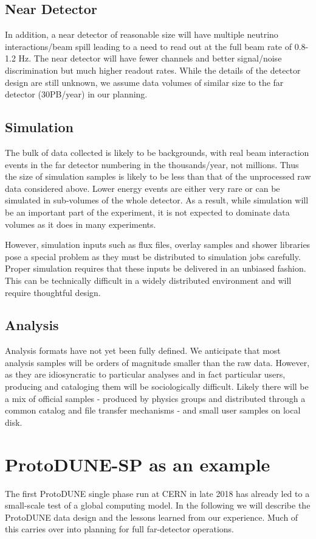 \subsection{Near Detector}
In addition, a near detector of reasonable size will have multiple neutrino interactions/beam spill leading to a need to read out at the full beam rate of 0.8-1.2 Hz.
The near detector will have fewer channels and better signal/noise discrimination but much higher readout rates.  While the details of the detector design are still unknown, we assume data volumes of similar size to the far detector (30PB/year) in our planning.

\subsection{Simulation}
The bulk of data collected is likely to be backgrounds, with real beam interaction events in the far detector numbering in the thousands/year, not millions. Thus the size of simulation samples is likely to be less than that of the unprocessed raw data considered above.  Lower energy events are either very rare or can be simulated in sub-volumes of the whole detector.  As a result, while simulation will be an important part of the experiment, it is not expected to dominate data volumes as it does in many experiments.  

However, simulation inputs such as flux files, overlay samples and shower libraries pose a special problem as they must be distributed to simulation jobs carefully.  Proper simulation requires that these inputs be delivered in an unbiased fashion. This can be technically difficult in a widely distributed environment and will require thoughtful design. 

\subsection{Analysis}

Analysis formats have not yet been fully defined.  We anticipate that most analysis samples will be orders of magnitude smaller than the raw data.  However, as they are idiosyncratic to particular analyses and in fact particular users,  producing and cataloging them will be sociologically difficult. 
Likely there will be a mix of official samples -  produced by physics groups and distributed through a common catalog and file transfer mechanisms - and small user samples on local disk. 


\section{ProtoDUNE-SP as an example}
\label{ch:exec-comp-proto-SP}
The first ProtoDUNE single phase run at CERN in late 2018 has already led to a small-scale test of a global computing model.  In the following we will describe the ProtoDUNE data design and the lessons learned from our experience. Much of this carries over into planning for full far-detector operations. 


